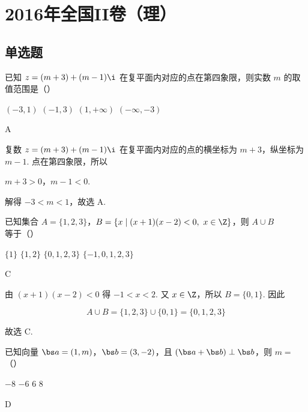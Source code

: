 
\chapter{2016年全国II卷（理）}

\section{单选题}

\begin{problem}
已知 \(z=(m+3)+(m-1)\i\) 在复平面内对应的点在第四象限，则实数 \(m\) 的取值范围是（\quad）

\choices
    {\((-3,1)\)}
    {\((-1,3)\)}
    {\((1,+\infty)\)}
    {\((-\infty,-3)\)}
\end{problem}

\begin{answer}
A
\end{answer}

\begin{solution}
复数 \(z=(m+3)+(m-1)\i\) 在复平面内对应的点的横坐标为 \(m+3\)，纵坐标为 \(m-1\). 点在第四象限，所以

\(m+3>0\)，\(m-1<0\).

解得 \(-3<m<1\)，故选 A.
\end{solution}

\begin{problem}
已知集合 \(A=\{1,2,3\}\)，\(B=\{x\mid(x+1)(x-2)<0,\ x\in\Z\}\)，则 \(A\cup B\) 等于（\quad）

\choices
    {\(\{1\}\)}
    {\(\{1,2\}\)}
    {\(\{0,1,2,3\}\)}
    {\(\{-1,0,1,2,3\}\)}
\end{problem}

\begin{answer}
C
\end{answer}

\begin{solution}
由 \((x+1)(x-2)<0\) 得 \(-1<x<2\). 又 \(x\in\Z\)，所以 \(B=\{0,1\}\). 因此

\[
A\cup B=\{1,2,3\}\cup\{0,1\}=\{0,1,2,3\}
\]

故选 C.
\end{solution}

\begin{problem}
已知向量 \(\bs a=(1,m)\)，\(\bs b=(3,-2)\)，且 \((\bs a+\bs b)\perp\bs b\)，则 \(m=\)（\quad）

\choices
    {\(-8\)}
    {\(-6\)}
    {\(6\)}
    {\(8\)}
\end{problem}

\begin{answer}
D
\end{answer}

